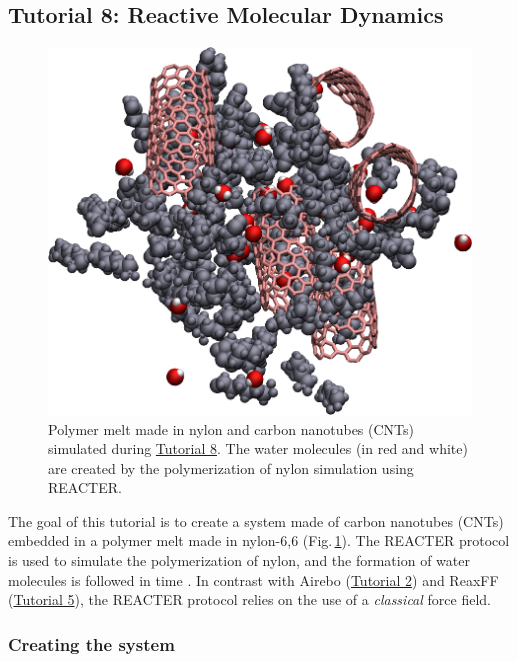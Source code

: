 \documentclass[9pt,tutorial]{livecoms}
\begin{document}
\subsection{Tutorial 8: Reactive Molecular Dynamics}
\label{bond-react-label}

\begin{figure}
\centering
\includegraphics[width=0.55\linewidth]{REACT}
\caption{Polymer melt made in nylon and carbon nanotubes (CNTs) simulated during
\hyperref[bond-react-label]{Tutorial 8}. The water molecules (in red and white)
are created by the polymerization of nylon simulation using REACTER.}
\label{fig:REACT}
\end{figure}

The goal of this tutorial is to create a system made of 
carbon nanotubes (CNTs) embedded in a polymer melt made in nylon-6,6 (Fig.\,\ref{fig:REACT}). The
REACTER protocol is used to simulate the polymerization of nylon, and the formation
of water molecules is followed in time \cite{gissinger2020reacter, gissinger2024molecular}.
In contrast with Airebo (\hyperref[carbon-nanotube-label]{Tutorial 2})
and ReaxFF (\hyperref[reactive-silicon-dioxide-label]{Tutorial 5}), the REACTER
protocol relies on the use of a \textit{classical} force field.

\subsubsection{Creating the system}
\end{document}
